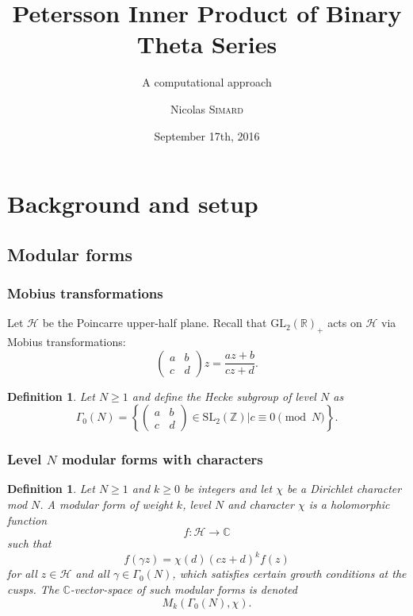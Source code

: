 \documentclass{beamer}
\title{Petersson Inner Product of Binary Theta Series}
\subtitle{A computational approach}
\author{Nicolas \textsc{Simard}}
\institute{McGill University}
\date{September 17th, 2016}
\newcommand{\C}{\mathbb{C}}
\newcommand{\R}{\mathbb{R}}
\newcommand{\Z}{\mathbb{Z}}
\renewcommand{\H}{\mathcal{H}}
\newcommand{\abcdmat}{\begin{pmatrix}
a & b \\ 
c & d
\end{pmatrix}}
\newtheorem{defn}[thm]{Definition}
\begin{document}
\begin{frame}
\titlepage
\end{frame}


\section{Background and setup}
\subsection{Modular forms}

\begin{frame}
\frametitle{Mobius transformations}
Let $\H$ be the Poincarre upper-half plane. Recall that $\text{GL}_2(\R)_+$ acts on $\H$ via Mobius transformations:
\[\abcdmat z=\frac{az+b}{cz+d}.\]
\begin{defn}
	Let $N\geq1$ and define the Hecke subgroup of level $N$ as
	\[\Gamma_0(N)=\left\lbrace\abcdmat \in\text{SL}_2(\Z)| c\equiv 0\pmod N\right\rbrace.\]
\end{defn}
	
\end{frame}

\begin{frame}
\frametitle{Level $N$ modular forms with characters}

\begin{defn}
	Let $N\geq1$ and $k\geq0$ be integers and let $\chi$ be a Dirichlet character mod $N$. A modular form of weight $k$, level $N$ and character $\chi$ is a holomorphic function
	\[f:\H\longrightarrow\C\]
	such that
	\[f\left(\gamma z\right)=\chi(d)(cz+d)^kf(z)\]
	for all $z\in\H$ and all $\gamma\in\Gamma_0(N)$, which satisfies certain growth conditions at the cusps.	The $\C$-vector-space of such modular forms is denoted
	\[M_k(\Gamma_0(N),\chi).\]
\end{defn}
	
\end{frame}	
	
\end{document}
